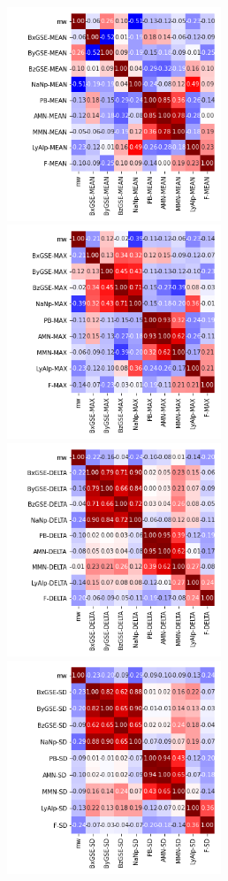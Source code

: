\documentclass[12pt]{article}
\begin{document}
\newpage

\begin{figure}
   \includegraphics[width=0.57\textwidth]{eight-nine_mean_2.png}
   \includegraphics[width=0.57\textwidth]{eight-nine_max_2.png}
   \includegraphics[width=0.57\textwidth]{eight-nine_delta_2.png}
   \includegraphics[width=0.57\textwidth]{eight-nine_sd_2.png}
\end{figure}
\end{document}
